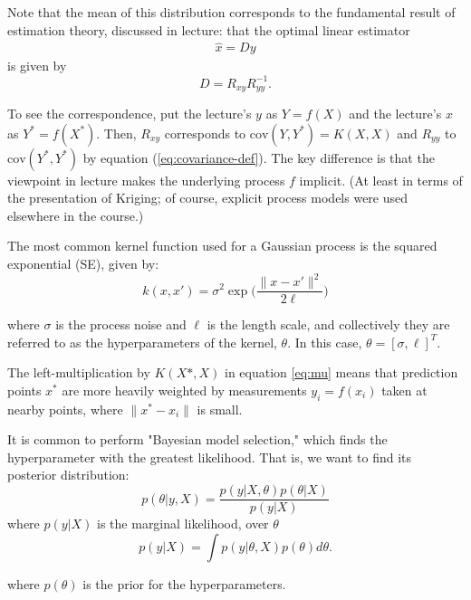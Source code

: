 \documentclass[conference]{IEEEtran}
\begin{document}
Note that the mean of this distribution corresponds to the
fundamental result of estimation theory, discussed in lecture:
that the optimal linear estimator 
\begin{align*}
    \hat{x} = D y
\end{align*}
is given by
\begin{equation*}
    D = R_{xy} R_{yy}^{-1}.
\end{equation*}

To see the correspondence, put the lecture's $y$ as
$Y = f(X)$ and the lecture's $x$ as $Y^* = f(X^*)$.
Then, $R_{xy}$ corresponds to $\text{cov}(Y, Y^*) = K(X, X)$
and $R_{yy}$ to $\text{cov}(Y^*, Y^*)$ by equation
(\ref{eq:covariance-def}). The key difference is that
the viewpoint in lecture makes the underlying process $f$
implicit. (At least in terms of the presentation of Kriging;
of course, explicit process models were used elsewhere
in the course.)

\newcommand{\norm}[1]{\lVert #1 \rVert}
The most common kernel function used for a Gaussian process is
the squared exponential (SE), given by:
\begin{equation*}
    k(x, x') = \sigma^2 \exp\biggl(\frac{\norm{x - x'}^2}{2 \ell}\biggr)
\end{equation*}

where $\sigma$ is the process noise and $\ell$ is the length
scale, and collectively they are referred to as the
hyperparameters of the kernel, $\theta$. In this case,
$\theta=[\sigma, \ell]^T$.

The left-multiplication by $K(X*, X)$ in equation \ref{eq:mu}
means that prediction points $x^*$ are more heavily
weighted by measurements $y_i=f(x_i)$ taken at nearby points,
where $\norm{x^* - x_i}$ is small.

It is common to perform "Bayesian model selection," which finds
the hyperparameter with the greatest likelihood. That is,
we want to find its posterior distribution:
\begin{equation*}
    \label{eq:model-select}
    p(\theta | y, X) = \frac{p(y|X,\theta)p(\theta|X)}{p(y|X)}
\end{equation*}
where $p(y|X)$ is the marginal likelihood, over $\theta$
\begin{equation*}
    p(y|X) = \int p(y|\theta, X) p(\theta) d\theta.
\end{equation*}

where $p(\theta)$ is the prior for the hyperparameters.
\end{document}
